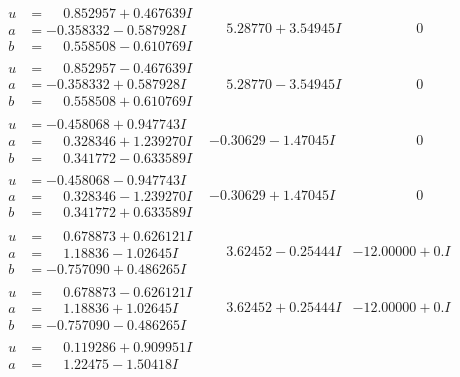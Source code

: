 \documentclass[1p]{elsarticle_modified}
\theoremstyle{definition}
\begin{document}
$$\begin{array}{c|c|c}
\begin{aligned}
u &= \phantom{-}0.852957 + 0.467639 I \\
a &= -0.358332 - 0.587928 I \\
b &= \phantom{-}0.558508 - 0.610769 I\end{aligned}
 & \phantom{-}5.28770 + 3.54945 I & \phantom{-0.000000 } 0 \\ \hline\begin{aligned}
u &= \phantom{-}0.852957 - 0.467639 I \\
a &= -0.358332 + 0.587928 I \\
b &= \phantom{-}0.558508 + 0.610769 I\end{aligned}
 & \phantom{-}5.28770 - 3.54945 I & \phantom{-0.000000 } 0 \\ \hline\begin{aligned}
u &= -0.458068 + 0.947743 I \\
a &= \phantom{-}0.328346 + 1.239270 I \\
b &= \phantom{-}0.341772 - 0.633589 I\end{aligned}
 & -0.30629 - 1.47045 I & \phantom{-0.000000 } 0 \\ \hline\begin{aligned}
u &= -0.458068 - 0.947743 I \\
a &= \phantom{-}0.328346 - 1.239270 I \\
b &= \phantom{-}0.341772 + 0.633589 I\end{aligned}
 & -0.30629 + 1.47045 I & \phantom{-0.000000 } 0 \\ \hline\begin{aligned}
u &= \phantom{-}0.678873 + 0.626121 I \\
a &= \phantom{-}1.18836 - 1.02645 I \\
b &= -0.757090 + 0.486265 I\end{aligned}
 & \phantom{-}3.62452 - 0.25444 I & -12.00000 + 0. I\phantom{ +0.000000I} \\ \hline\begin{aligned}
u &= \phantom{-}0.678873 - 0.626121 I \\
a &= \phantom{-}1.18836 + 1.02645 I \\
b &= -0.757090 - 0.486265 I\end{aligned}
 & \phantom{-}3.62452 + 0.25444 I & -12.00000 + 0. I\phantom{ +0.000000I} \\ \hline\begin{aligned}
u &= \phantom{-}0.119286 + 0.909951 I \\
a &= \phantom{-}1.22475 - 1.50418 I \\

\end{aligned}
\end{array}$$
\end{document}

